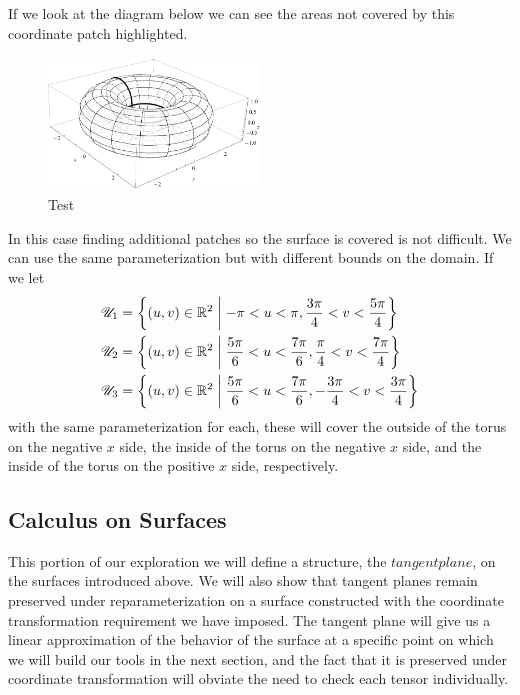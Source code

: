 If we look at the diagram below we can see the areas not covered by this coordinate patch highlighted.
\begin{figure}[t] %
  \centering
  \includegraphics[width=0.5\textwidth]{figures/torus.pdf}
  \caption{Test}
\end{figure}
In this case finding additional patches so the surface is covered is not difficult. We can use the same parameterization but with different bounds on the domain. If we let
\begin{align*}
  \mathscr{U}_1 &= \left\{(u, v) \in \mathbb{R}^2\;\middle\vert\;-\pi < u < \pi, \frac{3\pi}{4} < v < \frac{5\pi}{4}\right\}\\
  \mathscr{U}_2 &= \left\{(u, v) \in \mathbb{R}^2\;\middle\vert\;\frac{5\pi}{6} < u < \frac{7\pi}{6}, \frac{\pi}{4} < v < \frac{7\pi}{4}\right\}\\
  \mathscr{U}_3 &= \left\{(u, v) \in \mathbb{R}^2\;\middle\vert\;\frac{5\pi}{6} < u < \frac{7\pi}{6}, -\frac{3\pi}{4} < v < \frac{3\pi}{4}\right\}
\end{align*}
with the same parameterization for each, these will cover the outside of the torus on the negative $x$ side, the inside of the torus on the negative $x$ side, and the inside of the torus on the positive $x$ side, respectively.




\subsection{Calculus on Surfaces}

This portion of our exploration we will define a structure, the $tangent plane$, on the surfaces introduced above. We will also show that tangent planes remain preserved under reparameterization on a surface constructed with the coordinate transformation requirement we have imposed. The tangent plane will give us a linear approximation of the behavior of the surface at a specific point on which we will build our tools in the next section, and the fact that it is preserved under coordinate transformation will obviate the need to check each tensor individually.

